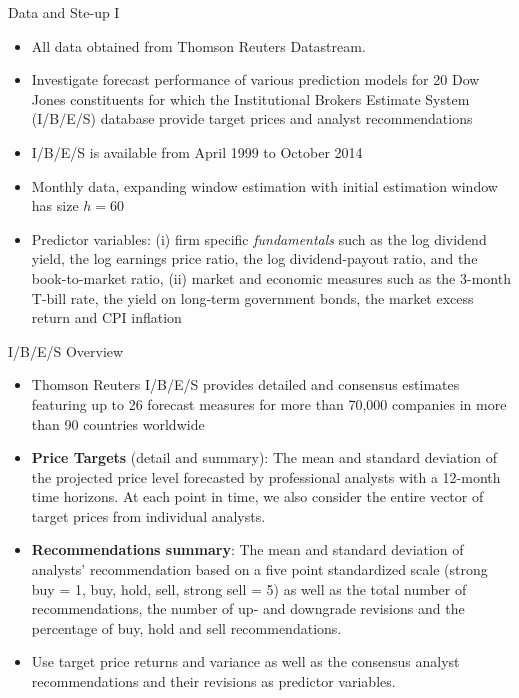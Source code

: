 \documentclass[9pt,xcolor=x11names,compress]{beamer}
\theoremstyle{standard}
\theoremstyle{notes}
\begin{document}
\begin{frame}{Data and Ste-up I}
	\begin{itemize}
		\item All data obtained from Thomson Reuters Datastream. 
		\item Investigate forecast performance of various prediction models for 20 Dow Jones constituents for which the Institutional Brokers Estimate System (I/B/E/S) database provide target prices and analyst recommendations
		\item I/B/E/S is available from April 1999 to October 2014
		\item Monthly data, expanding window estimation with  initial estimation window has size $h=60$
		\item Predictor variables: (i) firm specific \textit{fundamentals} such as the log dividend yield, the log earnings price ratio, the log dividend-payout ratio, and the book-to-market ratio, (ii) market and economic measures such as the 3-month T-bill rate, the yield on long-term government bonds, the market excess return and CPI inflation
	\end{itemize}
\end{frame}

\begin{frame}{I/B/E/S Overview}
	\begin{itemize}
		\item Thomson Reuters I/B/E/S provides detailed and consensus estimates featuring up to 26 forecast measures for more than 70,000 companies in more than 90 countries worldwide
		\item \textbf{Price Targets} (detail and summary): The mean and standard deviation of the projected price level forecasted by professional analysts with a 12-month time horizons. At each point in time, we also consider the entire vector of target prices from individual analysts.
		\item \textbf{Recommendations summary}: The mean and standard deviation of analysts' recommendation based on a five point standardized scale (strong buy = 1, buy, hold, sell, strong sell = 5) as well as the total number of recommendations, the number of up- and downgrade revisions and the percentage of buy, hold and sell recommendations.

	\item Use target price returns and variance as well as the consensus analyst recommendations and their revisions as predictor variables. 
		\end{itemize}
\end{frame}
\end{document}
